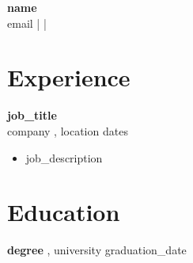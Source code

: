 \documentclass{article}
\begin{document}
\begin{center}
    {\LARGE \textbf{{ name }}} \\
    {{ email }} \quad |  \quad | 
\end{center}

\section*{Experience}
\textbf{{ job_title }} \\
{{ company }}, {{ location }} \hfill {{ dates }} \\
\begin{itemize}[leftmargin=*]
    \item {{ job_description }}
\end{itemize}

\section*{Education}
\textbf{{ degree }}, {{ university }} \hfill {{ graduation_date }}
\end{document}
